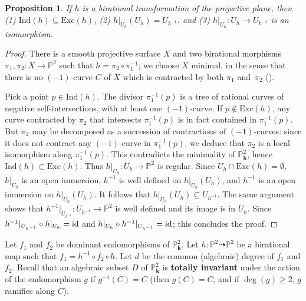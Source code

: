 \documentclass[reqno,oneside,12pt]{amsart}
\theoremstyle{plain}
\newtheorem{pro}[thm]{Proposition}
\theoremstyle{definition}
\def\bfk{{\mathbf{k}}}
\newcommand{\id}{{\rm id}}
\def\P{\mathbb{P}}
\def\Ind{{\text{Ind}}}
\def\Exc{{\text{Exc}}}
\begin{document}
\begin{pro}\label{prouhreg} If $h$ is a birational transformation of the projective plane, then 
(1) $\Ind(h)\subseteq \Exc(h)$, (2) $h|_{U_h}(U_h)=U_{h^{-1}}$, and  (3) $h|_{U_h}: U_h\to U_{h^{-1}}$ is an isomorphism. 
\end{pro}
\begin{proof}
There is a smooth projective surface $X$ and two birational morphisms $\pi_1,\pi_2: X\to \P^2$ such that $h=\pi_2\circ\pi_1^{-1}$;
we choose $X$ minimal, in the sense that there is no $(-1)$-curve $C$ of $X$ which is contracted by both $\pi_1$ and~$\pi_2$ (\cite{Hartshorne1977}).

Pick a point $p\in \Ind(h)$. The divisor $\pi_1^{-1}(p)$ is a tree of rational curves of negative self-intersections, 
with at least one $(-1)$-curve. If $p\notin \Exc(h)$, any curve  contracted by $\pi_2$ that intersects $\pi_1^{-1}(p)$ is in fact contained in $\pi_1^{-1}(p)$.
But $\pi_2$ may be decomposed as a succession of contractions of $(-1)$-curves: since it does not contract any $(-1)$-curve in $\pi_1^{-1}(p)$, 
we deduce that $\pi_2$ is a local isomorphism along $\pi_1^{-1}(p)$. This contradicts the minimality of $\P^2_\bfk$, hence $\Ind(h)\subset \Exc(h)$.
Thus  $h|_{U_h}: U_h\to \P^2$ is regular.  Since $U_h\cap \Exc(h)=\emptyset,$ $h|_{U_h}$ is an open immersion,  $h^{-1}$ is well defined on $h|_{U_h}(U_h)$, and $h^{-1}$ is an open immersion on $h|_{U_h}(U_h)$. It follows that $h|_{U_h}(U_h)\subseteq U_{h^{-1}}.$
The same argument shows that $h^{-1}|_{U_{h^{-1}}}: U_{h^{-1}}\to \P^2$ is well defined and its image is in $U_h.$
Since $h^{-1}|_{U_{h^{-1}}}\circ h|_{U_h}=\id$ and $h|_{U_h}\circ h^{-1}|_{U_{h^{-1}}}=\id$; this concludes the proof. 
\end{proof}

\medskip

Let $f_1$ and $f_2$ be dominant endomorphisms of $\P^2_\bfk$. Let $h:\P^2\dashrightarrow \P^2$ be a birational map such that $f_1=h^{-1}\circ f_2\circ h$.
Let $d$ be the common (algebraic) degree of $f_1$ and $f_2$.
Recall that an algebraic subset $D$ of $\P^2_\bfk$ is {\bf{totally invariant}} under the action of the endomorphism $g$ if $g^{-1}(C)=C$
(then $g(C)=C$, and if $\deg(g)\geq 2$, $g$ ramifies along $C$).
\end{document}
